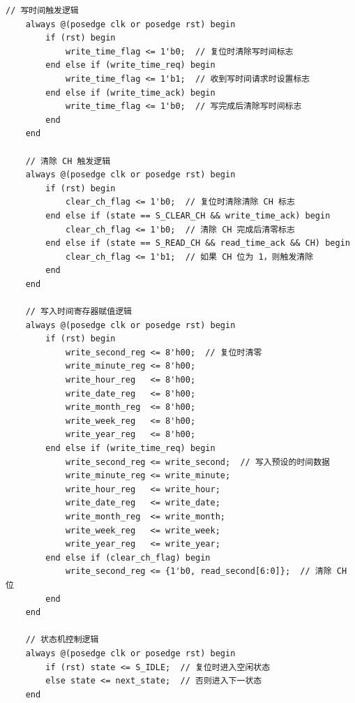 \documentclass[a4paper,10pt]{article}
\begin{document}
\begin{lstlisting}[caption=ds1302_test.v]
    // 写时间触发逻辑
    always @(posedge clk or posedge rst) begin
        if (rst) begin
            write_time_flag <= 1'b0;  // 复位时清除写时间标志
        end else if (write_time_req) begin
            write_time_flag <= 1'b1;  // 收到写时间请求时设置标志
        end else if (write_time_ack) begin
            write_time_flag <= 1'b0;  // 写完成后清除写时间标志
        end
    end

    // 清除 CH 触发逻辑
    always @(posedge clk or posedge rst) begin
        if (rst) begin
            clear_ch_flag <= 1'b0;  // 复位时清除清除 CH 标志
        end else if (state == S_CLEAR_CH && write_time_ack) begin
            clear_ch_flag <= 1'b0;  // 清除 CH 完成后清零标志
        end else if (state == S_READ_CH && read_time_ack && CH) begin
            clear_ch_flag <= 1'b1;  // 如果 CH 位为 1，则触发清除
        end
    end

    // 写入时间寄存器赋值逻辑
    always @(posedge clk or posedge rst) begin
        if (rst) begin
            write_second_reg <= 8'h00;  // 复位时清零
            write_minute_reg <= 8'h00;
            write_hour_reg   <= 8'h00;
            write_date_reg   <= 8'h00;
            write_month_reg  <= 8'h00;
            write_week_reg   <= 8'h00;
            write_year_reg   <= 8'h00;
        end else if (write_time_req) begin
            write_second_reg <= write_second;  // 写入预设的时间数据
            write_minute_reg <= write_minute;
            write_hour_reg   <= write_hour;
            write_date_reg   <= write_date;
            write_month_reg  <= write_month;
            write_week_reg   <= write_week;
            write_year_reg   <= write_year;
        end else if (clear_ch_flag) begin
            write_second_reg <= {1'b0, read_second[6:0]};  // 清除 CH 位
        end
    end

    // 状态机控制逻辑
    always @(posedge clk or posedge rst) begin
        if (rst) state <= S_IDLE;  // 复位时进入空闲状态
        else state <= next_state;  // 否则进入下一状态
    end


\end{lstlisting}
\end{document}
